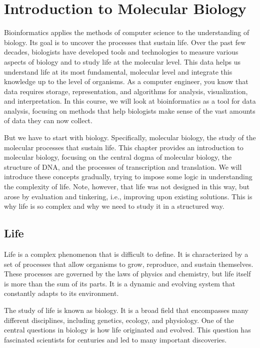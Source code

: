 \chapter{Introduction to Molecular Biology}
\label{ch:intro-mol-biol}

Bioinformatics applies the methods of computer science to the understanding of biology. Its goal is to uncover the processes that sustain life. Over the past few decades, biologists have developed tools and technologies to measure various aspects of biology and to study life at the molecular level. This data helps us understand life at its most fundamental, molecular level and integrate this knowledge up to the level of organisms. As a computer engineer, you know that data requires storage, representation, and algorithms for analysis, visualization, and interpretation. In this course, we will look at bioinformatics as a tool for data analysis, focusing on methods that help biologists make sense of the vast amounts of data they can now collect.

But we have to start with biology. Specifically, molecular biology, the study of the molecular processes that sustain life. This chapter provides an introduction to molecular biology, focusing on the central dogma of molecular biology, the structure of DNA, and the processes of transcription and translation. We will introduce these concepts gradually, trying to impose some logic in understanding the complexity of life. Note, however, that life was not designed in this way, but arose by evaluation and tinkering, i.e., improving upon existing solutions. This is why life is so complex and why we need to study it in a structured way.

\section{Life}

Life is a complex phenomenon that is difficult to define. It is characterized by a set of processes that allow organisms to grow, reproduce, and sustain themselves. These processes are governed by the laws of physics and chemistry, but life itself is more than the sum of its parts. It is a dynamic and evolving system that constantly adapts to its environment.

The study of life is known as biology. It is a broad field that encompasses many different disciplines, including genetics, ecology, and physiology. One of the central questions in biology is how life originated and evolved. This question has fascinated scientists for centuries and led to many important discoveries.

